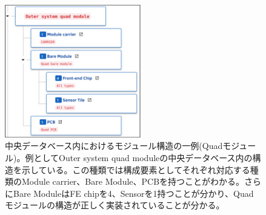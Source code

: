 \begin{figure}[bpt]\centering
\includegraphics[width=6cm]{./example_module_structure.png}
\caption[中央データベース内におけるモジュール構造の一例(Quadモジュール)]{中央データベース内におけるモジュール構造の一例(Quadモジュール)。例としてOuter system quad moduleの中央データベース内の構造を示している。この種類では構成要素としてそれぞれ対応する種類のModule carrier、Bare Module、PCBを持つことがわかる。さらにBare ModuleはFE chipを4、Sensorを1持つことが分かり、Quadモジュールの構造が正しく実装されていることが分かる。}
\label{example_module_structure}
\end{figure}

